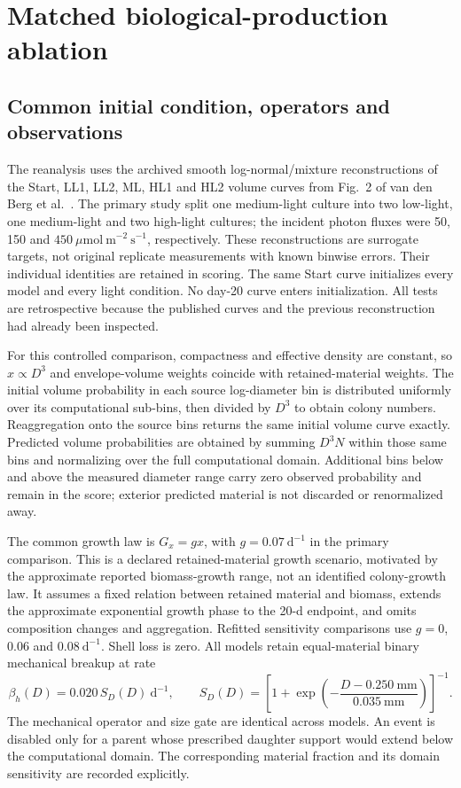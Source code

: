 \section{Matched biological-production ablation}
\label{app:matched-ablation}

\subsection{Common initial condition, operators and observations}

The reanalysis uses the archived smooth log-normal/mixture reconstructions of the Start, LL1, LL2, ML, HL1 and HL2 volume curves from Fig.~2 of van den Berg et al.\ \cite{VandenBerg2019}. The primary study split one medium-light culture into two low-light, one medium-light and two high-light cultures; the incident photon fluxes were 50, 150 and $450~\mu\mathrm{mol~m^{-2}~s^{-1}}$, respectively. These reconstructions are surrogate targets, not original replicate measurements with known binwise errors. Their individual identities are retained in scoring. The same Start curve initializes every model and every light condition. No day-20 curve enters initialization. All tests are retrospective because the published curves and the previous reconstruction had already been inspected.

For this controlled comparison, compactness and effective density are constant, so $x\propto D^3$ and envelope-volume weights coincide with retained-material weights. The initial volume probability in each source log-diameter bin is distributed uniformly over its computational sub-bins, then divided by $D^3$ to obtain colony numbers. Reaggregation onto the source bins returns the same initial volume curve exactly. Predicted volume probabilities are obtained by summing $D^3N$ within those same bins and normalizing over the full computational domain. Additional bins below and above the measured diameter range carry zero observed probability and remain in the score; exterior predicted material is not discarded or renormalized away.

The common growth law is $G_x=gx$, with $g=0.07~\mathrm{d^{-1}}$ in the primary comparison. This is a declared retained-material growth scenario, motivated by the approximate reported biomass-growth range, not an identified colony-growth law. It assumes a fixed relation between retained material and biomass, extends the approximate exponential growth phase to the 20-d endpoint, and omits composition changes and aggregation. Refitted sensitivity comparisons use $g=0$, $0.06$ and $0.08~\mathrm{d^{-1}}$. Shell loss is zero. All models retain equal-material binary mechanical breakup at rate
\[
 \beta_h(D)=0.020\,S_D(D)~\mathrm{d^{-1}},\qquad
 S_D(D)=\left[1+\exp\!\left(-\frac{D-0.250~\mathrm{mm}}{0.035~\mathrm{mm}}\right)\right]^{-1}.
\]
The mechanical operator and size gate are identical across models. An event is disabled only for a parent whose prescribed daughter support would extend below the computational domain. The corresponding material fraction and its domain sensitivity are recorded explicitly.

